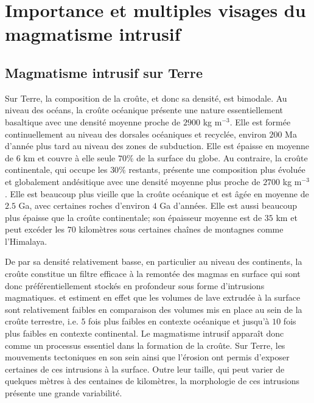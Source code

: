 \section{Importance et multiples visages du magmatisme intrusif}
\label{C1-sec:zool-des-intr}

\subsection{Magmatisme intrusif sur Terre}
\label{C1-sec:definition}

Sur Terre, la composition de la croûte, et donc sa densité, est
bimodale. Au niveau des océans, la croûte océanique présente une
nature essentiellement basaltique avec une densité moyenne proche de
$2900$ kg m$^{-3}$. Elle est formée continuellement au niveau des
dorsales océaniques et recyclée, environ $200$ Ma d'année plus tard au
niveau des zones de subduction. Elle est épaisse en moyenne de $6$ km
et couvre à elle seule $70\%$ de la surface du globe. Au contraire, la
croûte continentale, qui occupe les $30\%$ restants, présente une
composition plus évoluée et globalement andésitique avec une densité
moyenne plus proche de $2700$ kg m$^{-3}$. Elle est beaucoup plus
vieille que la croûte océanique et est âgée en moyenne de $2.5$ Ga,
avec certaines roches d'environ $4$ Ga d'années. Elle est aussi
beaucoup plus épaisse que la croûte continentale; son épaisseur
moyenne est de $35$ km et peut excéder les $70$ kilomètres sous
certaines chaînes de montagnes comme l'Himalaya.

De par sa densité relativement basse, en particulier au niveau des
continents, la croûte constitue un filtre efficace à la remontée des
magmas en surface qui sont donc préférentiellement stockés en
profondeur sous forme d'intrusions magmatiques. \citet{Crisp:1984dm}
et \citet{White:2006gr} estiment en effet que les volumes de lave
extrudée à la surface sont relativement faibles en comparaison des
volumes mis en place au sein de la croûte terrestre, i.e. $5$ fois
plus faibles en contexte océanique et jusqu'à $10$ fois plus faibles
en contexte continental. Le magmatisme intrusif apparaît donc comme
un processus essentiel dans la formation de la croûte. Sur Terre, les
mouvements tectoniques en son sein ainsi que l'érosion ont permis
d'exposer certaines de ces intrusions à la surface. Outre leur
taille, qui peut varier de quelques mètres à des centaines de
kilomètres, la morphologie de ces intrusions présente une grande
variabilité.

